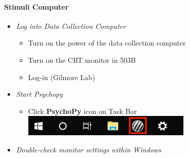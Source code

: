 \documentclass[]{article}
\providecommand{\tightlist}{%
  \setlength{\itemsep}{0pt}\setlength{\parskip}{0pt}}
\let\oldparagraph\paragraph
\renewcommand{\paragraph}[1]{\oldparagraph{#1}\mbox{}}
\begin{document}
\hypertarget{stimuli-computer}{%
\paragraph{Stimuli Computer}\label{stimuli-computer}}

\begin{itemize}
\tightlist
\item
  \emph{Log into Data Collection Computer}

  \begin{itemize}
  \tightlist
  \item
    Turn on the power of the data collection computer
  \item
    Turn on the CRT monitor in 503B
  \item
    Log-in (Gilmore Lab)
  \end{itemize}
\item
  \emph{Start Psychopy}

  \begin{itemize}
  \tightlist
  \item
    Click \textbf{PsychoPy} icon on Task Bar
    \includegraphics{images/PsychoPy-1.PNG}\\
  \end{itemize}
\item
  \emph{Double-check monitor settings within Windows}


\end{itemize}
\end{document}
